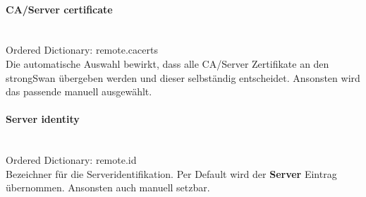 \begin{minipage}[t]{0.5\textwidth}
\paragraph{CA/Server certificate}\label{servercertificate}\mbox{}\\
\hspace*{18pt}Ordered Dictionary: remote.cacerts\\
Die automatische Auswahl bewirkt, dass alle CA/Server Zertifikate an den strongSwan übergeben werden und dieser selbständig entscheidet. Ansonsten wird das passende manuell ausgewählt.\\

\paragraph{Server identity}\label{serveridentitiy}\mbox{}\\
\hspace*{18pt}Ordered Dictionary: remote.id\\
Bezeichner für die Serveridentifikation. Per Default wird der \textbf{Server} Eintrag übernommen. Ansonsten auch manuell setzbar.\\

\end{minipage}
\newpage
